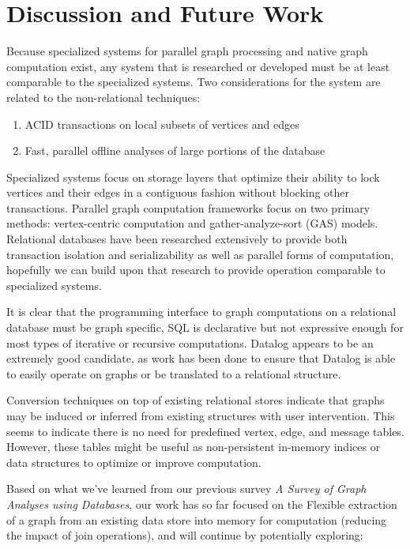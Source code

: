 \documentclass[11pt,letterpaper]{article}
\begin{document}
\section*{Discussion and Future Work}

Because specialized systems for parallel graph processing and native graph computation exist, any system that is researched or developed must be at least comparable to the specialized systems. Two considerations for the system are related to the non-relational techniques:

\begin{enumerate}
	\item ACID transactions on local subsets of vertices and edges
	\item Fast, parallel offline analyses of large portions of the database
\end{enumerate}

Specialized systems focus on storage layers that optimize their ability to lock vertices and their edges in a contiguous fashion without blocking other transactions. Parallel graph computation frameworks focus on two primary methods: vertex-centric computation and gather-analyze-sort (GAS) models. Relational databases have been researched extensively to provide both transaction isolation and serializability as well as parallel forms of computation, hopefully we can build upon that research to provide operation comparable to specialized systems.

It is clear that the programming interface to graph computations on a relational database must be graph specific, SQL is declarative but not expressive enough for most types of iterative or recursive computations. Datalog appears to be an extremely good candidate, as work has been done to ensure that Datalog is able to easily operate on graphs or be translated to a relational structure.

Conversion techniques on top of existing relational stores indicate that graphs may be induced or inferred from existing structures with user intervention. This seems to indicate there is no need for predefined vertex, edge, and message tables. However, these tables might be useful as non-persistent in-memory indices or data structures to optimize or improve computation.

Based on what we've learned from our previous survey \textit{A Survey of Graph Analyses using Databases}, our work has so far focused on the Flexible extraction of a graph from an existing data store into memory for computation (reducing the impact of join operations), and will continue by potentially exploring:
\end{document}
